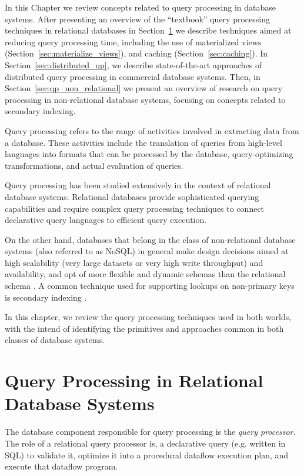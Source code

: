 In this Chapter we review concepts related to query processing in database systems.
After presenting an overview of the ``textbook'' query processing techniques in relational databases in Section~\ref{sec:query_pr_relational}
we describe techniques aimed at reducing query processing time, including the use of materialized views (Section~\ref{sec:materialize_views}),
and caching (Section~\ref{sec:caching}).
In Section~\ref{sec:distributed_qp}, we describe state-of-the-art approaches of distributed query processing in commercial database systems.
Then, in Section~\ref{sec:qp_non_relational} we present an overview of research on query processing in non-relational database systems,
focusing on concepts related to secondary indexing.

\bigskip
\noindent
Query processing refers to the range of activities involved in extracting data from a database.
These activities include the translation of queries from high-level languages into formats that can be processed
by the database, query-optimizing transformations, and actual evaluation of queries.

Query processing has been studied extensively in the context of relational database systems.
Relational databases provide sophisticated querying capabilities and require complex query processing techniques
to connect declarative query languages to efficient query execution.

On the other hand, databases that belong in the class of non-relational database systems (also referred to as NoSQL)
in general make design decisions aimed at high scalability (very large datasets or very high write throughput) and availability,
and opt of more flexible and dynamic schemas than the relational schema \cite{couchbase:nosqladoption}.
A common technique used for supporting lookups on non-primary keys is secondary indexing \cite{riakv:secondaryindexes, cassandra:secondaryindexing}.

In this chapter, we review the query processing techniques used in both worlds,
with the intend of identifying the primitives and approaches common in both classes of database systems.

\section{Query Processing in Relational Database Systems}
\label{sec:query_pr_relational}
The database component responsible for query processing is the \textit{query processor}.
The role of a relational query processor is, a declarative query (e.g. written in SQL) to validate it,
optimize it into a procedural dataflow execution plan, and execute that dataflow program.

